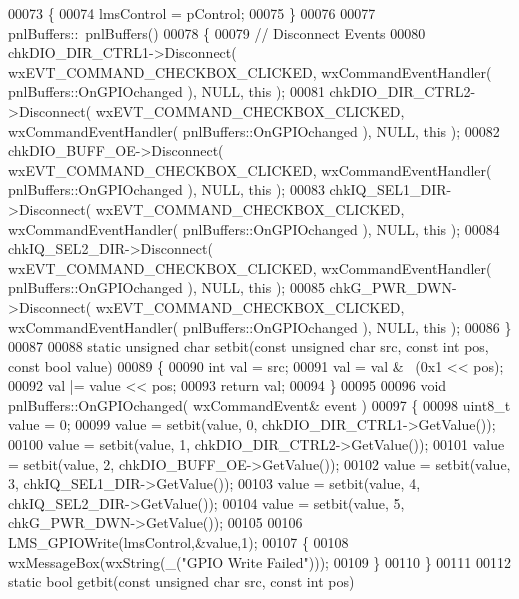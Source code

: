 \begin{DoxyCode}
00073 \{
00074     lmsControl = pControl;
00075 \}
00076 
00077 pnlBuffers::~pnlBuffers()
00078 \{
00079     \textcolor{comment}{// Disconnect Events}
00080     chkDIO\_DIR\_CTRL1->Disconnect( wxEVT\_COMMAND\_CHECKBOX\_CLICKED, wxCommandEventHandler( 
      pnlBuffers::OnGPIOchanged ), NULL, \textcolor{keyword}{this} );
00081     chkDIO\_DIR\_CTRL2->Disconnect( wxEVT\_COMMAND\_CHECKBOX\_CLICKED, wxCommandEventHandler( 
      pnlBuffers::OnGPIOchanged ), NULL, \textcolor{keyword}{this} );
00082     chkDIO\_BUFF\_OE->Disconnect( wxEVT\_COMMAND\_CHECKBOX\_CLICKED, wxCommandEventHandler( 
      pnlBuffers::OnGPIOchanged ), NULL, \textcolor{keyword}{this} );
00083     chkIQ\_SEL1\_DIR->Disconnect( wxEVT\_COMMAND\_CHECKBOX\_CLICKED, wxCommandEventHandler( 
      pnlBuffers::OnGPIOchanged ), NULL, \textcolor{keyword}{this} );
00084     chkIQ\_SEL2\_DIR->Disconnect( wxEVT\_COMMAND\_CHECKBOX\_CLICKED, wxCommandEventHandler( 
      pnlBuffers::OnGPIOchanged ), NULL, \textcolor{keyword}{this} );
00085     chkG\_PWR\_DWN->Disconnect( wxEVT\_COMMAND\_CHECKBOX\_CLICKED, wxCommandEventHandler( 
      pnlBuffers::OnGPIOchanged ), NULL, \textcolor{keyword}{this} );
00086 \}
00087 
00088 \textcolor{keyword}{static} \textcolor{keywordtype}{unsigned} \textcolor{keywordtype}{char} setbit(\textcolor{keyword}{const} \textcolor{keywordtype}{unsigned} \textcolor{keywordtype}{char} src, \textcolor{keyword}{const} \textcolor{keywordtype}{int} pos, \textcolor{keyword}{const} \textcolor{keywordtype}{bool} value)
00089 \{
00090     \textcolor{keywordtype}{int} val = src;
00091     val = val & ~(0x1 << pos);
00092     val |= value << pos;
00093     \textcolor{keywordflow}{return} val;
00094 \}
00095 
00096 \textcolor{keywordtype}{void} pnlBuffers::OnGPIOchanged( wxCommandEvent& event )
00097 \{
00098     uint8\_t value = 0;
00099     value = setbit(value, 0, chkDIO\_DIR\_CTRL1->GetValue());
00100     value = setbit(value, 1, chkDIO\_DIR\_CTRL2->GetValue());
00101     value = setbit(value, 2, chkDIO\_BUFF\_OE->GetValue());
00102     value = setbit(value, 3, chkIQ\_SEL1\_DIR->GetValue());
00103     value = setbit(value, 4, chkIQ\_SEL2\_DIR->GetValue());
00104     value = setbit(value, 5, chkG\_PWR\_DWN->GetValue());
00105 
00106     LMS_GPIOWrite(lmsControl,&value,1);
00107     \{
00108         wxMessageBox(wxString(\_(\textcolor{stringliteral}{"GPIO Write Failed"})));
00109     \}
00110 \}
00111 
00112 \textcolor{keyword}{static} \textcolor{keywordtype}{bool} getbit(\textcolor{keyword}{const} \textcolor{keywordtype}{unsigned} \textcolor{keywordtype}{char} src, \textcolor{keyword}{const} \textcolor{keywordtype}{int} pos)

\end{DoxyCode}
